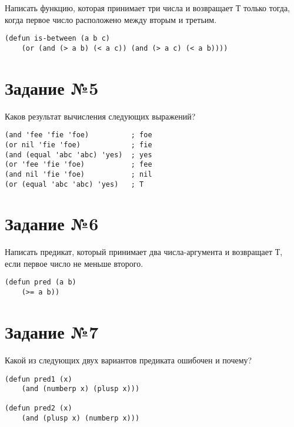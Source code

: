 Написать функцию, которая принимает три числа и возвращает Т только тогда, когда
первое число расположено между вторым и третьим.

\vspace{4mm}
\begin{minipage}{0.92\linewidth}
\begin{lstlisting}
(defun is-between (a b c)
    (or (and (> a b) (< a c)) (and (> a c) (< a b))))
\end{lstlisting}
\end{minipage}

\section{Задание №5}

Каков результат вычисления следующих выражений?

\vspace{4mm}
\begin{minipage}{0.92\linewidth}
\begin{lstlisting}
(and 'fee 'fie 'foe)          ; foe
(or nil 'fie 'foe)            ; fie
(and (equal 'abc 'abc) 'yes)  ; yes 
(or 'fee 'fie 'foe)           ; fee
(and nil 'fie 'foe)           ; nil
(or (equal 'abc 'abc) 'yes)   ; T
\end{lstlisting}
\end{minipage}

\section{Задание №6}

Написать предикат, который принимает два числа-аргумента и возвращает Т, если
первое число не меньше второго.

\vspace{4mm}
\begin{minipage}{0.92\linewidth}
\begin{lstlisting}
(defun pred (a b)
    (>= a b))
\end{lstlisting}
\end{minipage}

\section{Задание №7}

Какой из следующих двух вариантов предиката ошибочен и почему?

\vspace{4mm}
\begin{minipage}{0.92\linewidth}
\begin{lstlisting}
(defun pred1 (x)
    (and (numberp x) (plusp x)))

(defun pred2 (x)
    (and (plusp x) (numberp x)))
\end{lstlisting}
\end{minipage}

